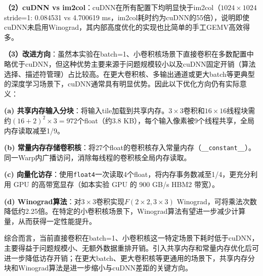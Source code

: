 \documentclass{SYSUReport}
\begin{document}
\textbf{（2）cuDNN vs im2col}：cuDNN在所有配置下均明显快于im2col（$1024\times1024$ stride=1: 0.084531 vs 4.700619 ms，im2col耗时约为cuDNN的55倍），说明即使cuDNN未启用Winograd，其内部高度优化的实现也比简单的手工GEMV高效得多。

\textbf{（3）改进方向}：虽然本实验在batch=1、小卷积核场景下直接卷积在多数配置中略优于cuDNN，但这种优势主要来源于问题规模较小以及cuDNN固定开销（算法选择、描述符管理）占比较高。在更大卷积核、多输出通道或更大batch等更典型的深度学习场景下，cuDNN通常具有明显优势。因此以下优化方向仍有实际意义：

\textbf{(a) 共享内存输入分块}：将输入tile加载到共享内存。$3\times3$卷积和$16\times16$线程块需约$(16+2)^2\times3=972$个float（约3.8 KB），每个输入像素被9个线程共享，全局内存读取减至1/9。

\textbf{(b) 常量内存存储卷积核}：将27个float的卷积核存入常量内存（\texttt{\_\_constant\_\_}）。同一Warp内广播访问，消除每线程的卷积核全局内存读取。

\textbf{(c) 向量化访存}：使用\texttt{float4}一次读取4个float，将内存事务数减至1/4，更充分利用 GPU 的高带宽显存（如本实验 GPU 的 900 GB/s HBM2 带宽）。

\textbf{(d) Winograd算法}：对$3\times3$卷积实现$F(2\times2,3\times3)$ Winograd，可将乘法次数降低约2.25倍。在特定的小卷积核场景下，Winograd算法有望进一步减少计算量，从而获得一定性能提升。

综合而言，当前直接卷积在batch=1、小卷积核这一特定场景下耗时低于cuDNN，主要得益于问题规模小、无额外数据重排开销。引入共享内存和常量内存优化后可进一步降低访存开销；在更大batch、更大卷积核等更通用的场景下，共享内存分块和Winograd算法是进一步缩小与cuDNN差距的关键方向。
\end{document}
